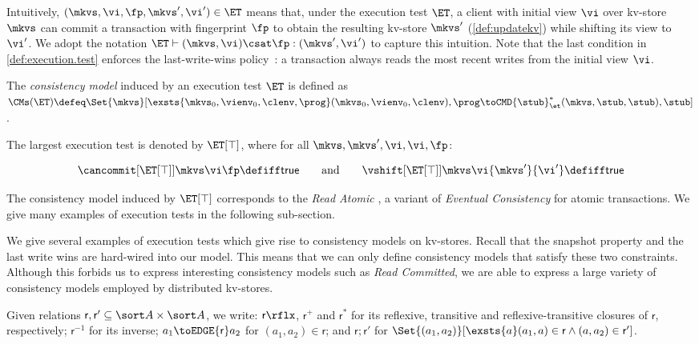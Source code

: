 Intuitively, \((\mkvs, \vi, \fp, \mkvs', \vi') \in \ET\) means that, under the execution test \(\ET\),
a client with initial view \(\vi\) over kv-store \(\mkvs\) can commit a transaction with 
fingerprint \(\fp\) to obtain the resulting kv-store \(\mkvs'\) (\cref{def:updatekv}) while shifting its view
to \(\vi'\). We adopt the notation \(\ET \vdash (\mkvs, \vi) \csat \fp: (\mkvs', \vi')\) to capture this intuition. 
Note that the last condition in \cref{def:execution.test} enforces the last-write-wins
policy~\cite{vogels:2009:ec:1435417.1435432}: 
a transaction always reads the most recent writes from the initial view \(\vi\).  

\SpaceAboveDef
\begin{definition}
\label{def:cm}
The \emph{consistency model} induced by an execution test \(\ET\) is defined as 
\(
\CMs(\ET) \defeq 
\Set{\mkvs}[ 
\exsts{\mkvs_0,\vienv_0,\clenv,\prog}
(\mkvs_0,\vienv_0,\clenv),\prog \toCMD{\stub}_{\et}^{*} (\mkvs, \stub, \stub),\stub
]
\).
\end{definition}
\SpaceBelowDef

The largest execution test is denoted by \(\ET[\top]\), where for all \(\mkvs, \mkvs', \vi, \vi, \fp\):%

\SpaceAboveMath
\[
	\cancommit[{\ET[\top]}] \mkvs \vi \fp \defiff \mathsf{true}
	\qquad  \text{and} \qquad 
	\vshift[{\ET[\top]}] \mkvs \vi {\mkvs'} {\vi'} \defiff \mathsf{true}
\]%
\SpaceBelowMath

The consistency model induced by \(\ET[\top]\) 
corresponds to the \emph{Read Atomic} \cite{ramp}, a variant of \emph{Eventual 
Consistency} \cite{ev_transactions} for atomic transactions. 
We give many examples of execution tests in the following sub-section. 


\label{subsec:cm_examples}
We give several examples of execution tests which give rise to consistency
models on kv-stores.
Recall that the snapshot property and the last write wins are hard-wired into our model. 
This means that we can only define  consistency models that satisfy these two constraints. 
Although this forbids us to express interesting consistency models such as \emph{Read Committed}, we are able to express a large variety of consistency models employed by distributed kv-stores.

Given relations \(\mathsf r, \mathsf r' \subseteq \sort A \times \sort A\),
we write:  \(\mathsf r\rflx\), \(\mathsf r^+\) and \(\mathsf r^*\) for its reflexive, transitive and reflexive-transitive closures of \(\mathsf r\), respectively;
\(\mathsf r^{-1}\) for its inverse;
\(a_1 \toEDGE{\mathsf r} a_2\) for \((a_1, a_2) \in \mathsf r\);
and \( \mathsf r; \mathsf r'\) for \( \Set{(a_1,a_2)}[\exsts{a} (a_1,a) \in \mathsf r\land (a,a_2) \in \mathsf r']\).

